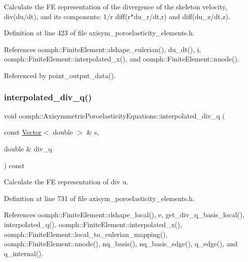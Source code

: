 Calculate the FE representation of the divergence of the skeleton velocity, div(du/dt), and its components\+: 1/r diff(r$\ast$du\+\_\+r/dt,r) and diff(du\+\_\+z/dt,z). 

Definition at line 423 of file axisym\+\_\+poroelasticity\+\_\+elements.\+h.



References oomph\+::\+Finite\+Element\+::dshape\+\_\+eulerian(), du\+\_\+dt(), i, oomph\+::\+Finite\+Element\+::interpolated\+\_\+x(), and oomph\+::\+Finite\+Element\+::nnode().



Referenced by point\+\_\+output\+\_\+data().

\mbox{\label{classoomph_1_1AxisymmetricPoroelasticityEquations_a82fbed7cdfe8bc66f3bdd43460d2df00}} 
\subsubsection{\texorpdfstring{interpolated\+\_\+div\+\_\+q()}{interpolated\_div\_q()}\hspace{0.1cm}{\footnotesize\ttfamily [1/2]}}
{\footnotesize\ttfamily void oomph\+::\+Axisymmetric\+Poroelasticity\+Equations\+::interpolated\+\_\+div\+\_\+q (\begin{DoxyParamCaption}\item[{const \hyperlink{classoomph_1_1Vector}{Vector}$<$ double $>$ \&}]{s,  }\item[{double \&}]{div\+\_\+q }\end{DoxyParamCaption}) const\hspace{0.3cm}{\ttfamily [inline]}}



Calculate the FE representation of div u. 



Definition at line 731 of file axisym\+\_\+poroelasticity\+\_\+elements.\+h.



References oomph\+::\+Finite\+Element\+::dshape\+\_\+local(), e, get\+\_\+div\+\_\+q\+\_\+basis\+\_\+local(), interpolated\+\_\+q(), oomph\+::\+Finite\+Element\+::interpolated\+\_\+x(), oomph\+::\+Finite\+Element\+::local\+\_\+to\+\_\+eulerian\+\_\+mapping(), oomph\+::\+Finite\+Element\+::nnode(), nq\+\_\+basis(), nq\+\_\+basis\+\_\+edge(), q\+\_\+edge(), and q\+\_\+internal().



